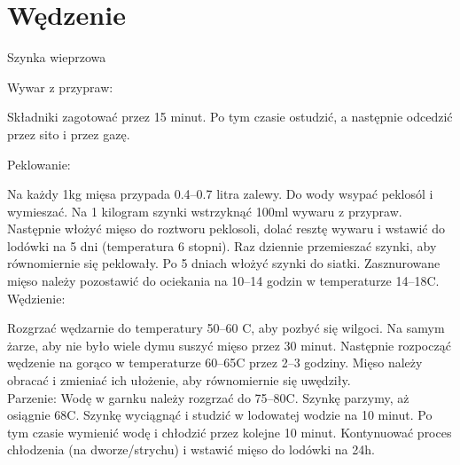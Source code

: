 \documentclass[a4paper,12pt]{article}
\begin{document}
\newpage
\section{Wędzenie}

\begin{recipe}{Szynka wieprzowa}{}{}

\freeform%
Wywar z przypraw:

Składniki zagotować przez 15 minut. Po tym czasie ostudzić, a następnie odcedzić przez sito i przez gazę.

\freeform%
Peklowanie:


Na każdy 1kg mięsa przypada 0.4--0.7 litra zalewy.
Do wody wsypać peklosól i wymieszać. Na 1 kilogram szynki wstrzyknąć 100ml wywaru z przypraw.
\freeform%
Następnie włożyć mięso do roztworu peklosoli, dolać resztę wywaru i wstawić do lodówki na 5 dni (temperatura 6 stopni). 
Raz dziennie przemieszać szynki, aby równomiernie się peklowały.
Po 5 dniach włożyć szynki do siatki.
Zasznurowane mięso należy pozostawić do ociekania na 10--14 godzin w temperaturze 14--18\0C. \\

Wędzienie:

Rozgrzać wędzarnie do temperatury 50--60 \0C, aby pozbyć się wilgoci.
Na samym żarze, aby nie było wiele dymu suszyć mięso przez 30 minut.
Następnie rozpocząć wędzenie na gorąco w temperaturze 60--65\0C przez 2--3 godziny. Mięso należy obracać i zmieniać ich ułożenie, aby równomiernie się uwędziły. \\

Parzenie:
Wodę w garnku należy rozgrzać do 75--80\0C. Szynkę parzymy, aż osiągnie 68\0C. 
Szynkę wyciągnąć i studzić w lodowatej wodzie na 10 minut. Po tym czasie wymienić wodę i chłodzić przez kolejne 10 minut. Kontynuować proces chłodzenia (na dworze/strychu) i wstawić mięso do lodówki na 24h.
\end{recipe}
\end{document}

